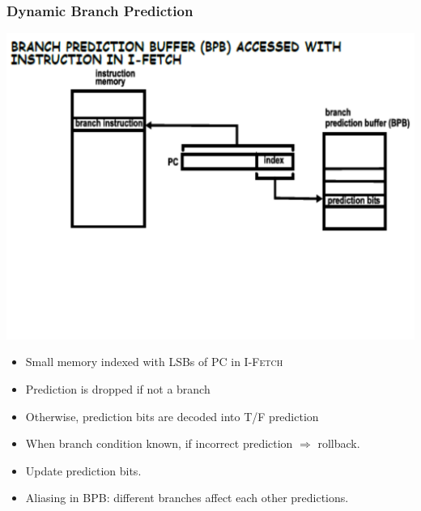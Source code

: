 \documentclass{beamer}
\begin{document}
\begin{frame}[fragile,t]
\frametitle{Dynamic Branch Prediction}

\includegraphics[width=55ex]{FigsOoOProc/BranchPredSimple.pdf}
\vspace{-14ex}
\pause


\begin{itemize}
    \item Small memory indexed with LSBs of PC in \textsc{I-Fetch}
    \item Prediction is dropped if not a branch
    \item Otherwise, prediction bits are decoded into T/F prediction
    \item When branch condition known, if incorrect prediction $\Rightarrow$ rollback.
    \item Update prediction bits.
    \item Aliasing in BPB: different branches affect each other predictions.
\end{itemize}
\end{frame}
\end{document}
